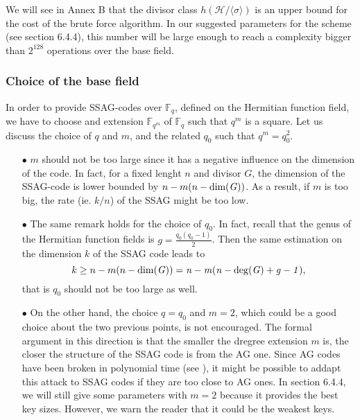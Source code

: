 \documentclass[10pt]{article}
\newcommand{\s}{\vspace{0.3cm}}
\newcommand{\calH}{\mathcal{H}}
\newcommand{\fqm}{\mathbb{F}_{q^m}}
\newcommand{\fq}{\mathbb{F}_q}
\begin{document}
\s 

We will see in Annex B that the divisor class $h(\calH/\langle \sigma \rangle)$
is an upper bound for the cost of the brute force algorithm. In our suggested parameters for the scheme (see section 6.4.4), this number will be large enough to reach a complexity bigger than $2^{128}$ operations over the base field.

\s

\subsubsection{Choice of the base field}

\s

In order to provide SSAG-codes over $\fq$, defined on the Hermitian function field, we have to choose and extension $\fqm$ of $\fq$ such that $q^m$ is a square. Let us discuss the choice of $q$ and $m$, and the related $q_0$ such that $q^m=q_0^2$.

\begin{enumerate}
\item[$\bullet$] $m$ should not be too large since it has a negative influence on the dimension of the code. In fact, for a fixed lenght $n$ and divisor $G$, the dimension of the SSAG-code is lower bounded by $n-m(n-\rm dim \it (G))$. As a result, if $m$ is too big, the rate (ie. $k/n$) of the SSAG might be too low.
\item[$\bullet$] The same remark holds for the choice of $q_0$. In fact, recall that the genus of the Hermitian function fields is $g=\frac{q_0(q_0-1)}{2}$. Then the same estimation on the dimension $k$ of the SSAG code leads to 
\[k \geq n-m(n-\rm dim \it (G)) = n-m(n- \deg(G) +g-1),\]
that is $q_0$ should not be too large as well.
\item[$\bullet$] On the other hand, the choice $q=q_0$ and $m=2$, which could be a good choice about the two previous points, is not encouraged. The formal argument in this direction is that the smaller the dregree extension $m$ is, the closer the structure of the SSAG code is from the AG one. Since AG codes have been broken in polynomial time (see \cite{Cou}), it might be possible to addapt this attack to SSAG codes if they are too close to AG ones. In section 6.4.4, we will still give some parameters with $m=2$ because it provides the best key sizes. However, we warn the reader that it could be the weakest keys. 
\end{enumerate}

\s 
\end{document}
